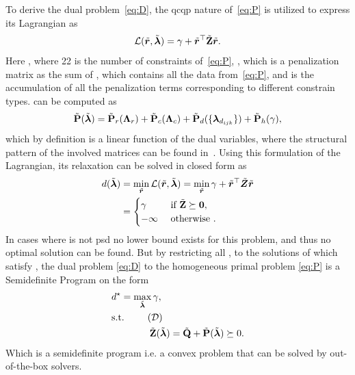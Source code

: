 To derive the dual problem~\ref{eq:D}, the \gls{qcqp} nature of~\ref{eq:P} is utilized to express its Lagrangian as
%
\begin{equation}\label{eq:lagrangian-p}
	\mathcal{L}(\tilde{\bm{r}}, \tilde{\bm{\lambda}}) = \gamma + \tilde{\bm{r}}^\top  \tilde{\bm{\mathrm{Z}}}  \tilde{\bm{r}}.
\end{equation}
Here , where \num{22} is the number of constraints of~\ref{eq:P}, , which is a penalization matrix as the sum of , which contains all the data from~\ref{eq:P}, and  is the accumulation of all the penalization terms corresponding to different constrain types.  can be computed as
%
\begin{equation}\label{eq:penalty-matrix}
	\tilde{\bm{\mathrm{P}}}(\tilde{\bm{\lambda}}) = \tilde{\bm{\mathrm{P}}}_r(\bm{\mathrm{\Lambda}}_r) + \tilde{\bm{\mathrm{P}}}_c(\bm{\mathrm{\Lambda}}_c) + \tilde{\bm{\mathrm{P}}}_d(\{ \bm{\lambda}_{d_{ijk}} \}) + \tilde{\bm{\mathrm{P}}}_h(\gamma),
\end{equation}
which by definition is a linear function of the dual variables, where the structural pattern of the involved matrices can be found in~\cite{convex-global-3d-registration-with-lagrangian-duality}. Using this formulation of the Lagrangian, its relaxation can be solved in closed form as 
\begin{align}
	d(\tilde{\bm{\lambda}})&=\min_{\tilde{\bm{r}}}\mathcal{L}(\tilde{\bm{r}},\tilde{\bm{\lambda}})=\min_{\tilde{\bm{r}}} \gamma + \tilde{\bm{r}}^\top \tilde{\bm{Z}} \tilde{\bm{r}} \\
	&= \begin{cases}
		\gamma & \text{ if } \tilde{\bm{\mathrm{Z}}} \succeq \bm{0}, \\
		-\infty & \text{ otherwise }.
	\end{cases}
\end{align}
In cases where  is not \gls{psd} no lower bound exists for this problem, and thus no optimal solution can be found. But by restricting all \mvar{\tilde{\vec{\lambda}}}, to the solutions of  which satisfy , the dual problem \ref{eq:D} to the homogeneous primal problem \ref{eq:P} is a Semidefinite Program on the form 
%
\begin{align*}
	& d^\star = \max_{\tilde{\vec{\lambda}}} \gamma, \\
	& \text{s.t. }         \tag{$\mathcal{D}$} \label{eq:D}\\ 
	&\qquad \qquad \tilde{\mat{Z}}(\tilde{\vec{\lambda}})=\tilde{\mat{Q}} + \tilde{\mat{P}}(\tilde{\vec{\lambda}}) \succeq 0. 
\end{align*}
Which is a semidefinite program i.e. a convex problem that can be solved by out-of-the-box solvers. \medskip

